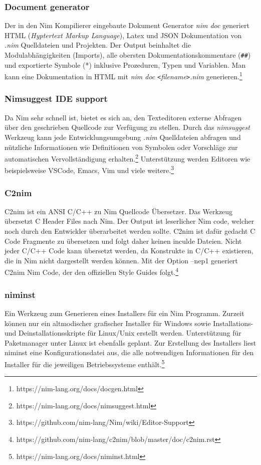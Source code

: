 \documentclass[11pt]{report}
\begin{document}
\subsubsection{Document generator}
Der in den Nim Kompilierer eingebaute Dokument Generator \emph{nim doc} generiert HTML (\emph{Hyptertext Markup Language}), Latex und JSON Dokumentation von \emph{.nim} Quelldateien und Projekten. Der Output beinhaltet die Modulabhängigkeiten (Imports), alle obersten Dokumentationskommentare (\verb|##|) und exportierte Symbole (*) inklusive Prozeduren, Typen und Variablen.
Man kann eine Dokumentation in HTML mit \emph{nim doc} \verb|<|\emph{filename}\verb|>|\emph{.nim} generieren.\footnote{https://nim-lang.org/docs/docgen.html}

\subsubsection{Nimsuggest IDE support}
Da Nim sehr schnell ist, bietet es sich an, den Texteditoren externe Abfragen über den geschrieben Quellcode zur Verfügung zu stellen.
Durch das \emph{nimsuggest} Werkzeug kann jede Entwicklungsumgebung \emph{.nim} Quelldateien abfragen und nützliche Informationen wie Definitionen von Symbolen oder Vorschläge zur automatischen Vervollständigung erhalten.\footnote{https://nim-lang.org/docs/nimsuggest.html} Unterstützung werden Editoren wie beispielsweise VSCode, Emacs, Vim und viele weitere.\footnote{https://github.com/nim-lang/Nim/wiki/Editor-Support}

\subsubsection{C2nim}
C2nim ist ein ANSI C/C++ zu Nim Quellcode Übersetzer. Das Werkzeug übersetzt C Header Files nach Nim. Der Output ist leserlicher Nim code, welcher noch durch den Entwickler überarbeitet werden sollte. C2nim ist dafür gedacht C Code Fragmente zu übersetzen und folgt daher keinen inculde Dateien. Nicht jeder C/C++ Code kann übersetzt werden, da Konstrukte in C/C++ existieren, die in Nim nicht dargestellt werden können. Mit der Option --nep1 generiert C2nim Nim Code, der den offiziellen Style Guides folgt.\footnote{https://github.com/nim-lang/c2nim/blob/master/doc/c2nim.rst}

\subsubsection{niminst}
Ein Werkzeug zum Generieren eines Installers für ein Nim Programm. Zurzeit können nur ein altmodischer grafischer Installer für Windows sowie Installations- und Deinstallationsskripte für Linux/Unix erstellt werden. Unterstützung für Paketmanager unter Linux ist ebenfalls geplant.
Zur Erstellung des Installers liest niminst eine Konfigurationsdatei aus, die alle notwendigen Informationen für den Installer für die jeweiligen Betriebssysteme enthält.\footnote{https://nim-lang.org/docs/niminst.html}
\end{document}
